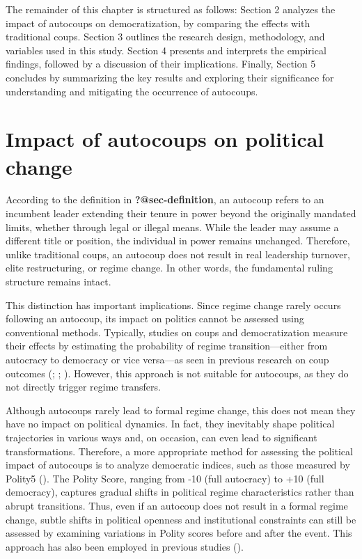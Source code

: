 \documentclass[
  12pt,
]{report}
\begin{document}
The remainder of this chapter is structured as follows: Section 2
analyzes the impact of autocoups on democratization, by comparing the
effects with traditional coups. Section 3 outlines the research design,
methodology, and variables used in this study. Section 4 presents and
interprets the empirical findings, followed by a discussion of their
implications. Finally, Section 5 concludes by summarizing the key
results and exploring their significance for understanding and
mitigating the occurrence of autocoups.

\section{Impact of autocoups on political
change}\label{impact-of-autocoups-on-political-change}

According to the definition in \textbf{?@sec-definition}, an autocoup
refers to an incumbent leader extending their tenure in power beyond the
originally mandated limits, whether through legal or illegal means.
While the leader may assume a different title or position, the
individual in power remains unchanged. Therefore, unlike traditional
coups, an autocoup does not result in real leadership turnover, elite
restructuring, or regime change. In other words, the fundamental ruling
structure remains intact.

This distinction has important implications. Since regime change rarely
occurs following an autocoup, its impact on politics cannot be assessed
using conventional methods. Typically, studies on coups and
democratization measure their effects by estimating the probability of
regime transition---either from autocracy to democracy or vice
versa---as seen in previous research on coup outcomes
(;
;
). However, this approach is not
suitable for autocoups, as they do not directly trigger regime
transfers.

Although autocoups rarely lead to formal regime change, this does not
mean they have no impact on political dynamics. In fact, they inevitably
shape political trajectories in various ways and, on occasion, can even
lead to significant transformations. Therefore, a more appropriate
method for assessing the political impact of autocoups is to analyze
democratic indices, such as those measured by Polity5
(). The Polity Score,
ranging from -10 (full autocracy) to +10 (full democracy), captures
gradual shifts in political regime characteristics rather than abrupt
transitions. Thus, even if an autocoup does not result in a formal
regime change, subtle shifts in political openness and institutional
constraints can still be assessed by examining variations in Polity
scores before and after the event. This approach has also been employed
in previous studies ().
\end{document}
